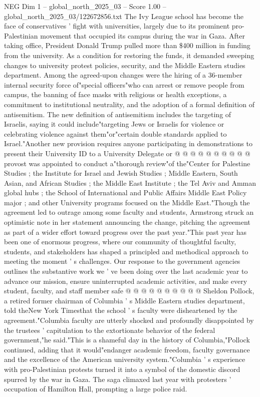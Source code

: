 \begin{textsample}{NEG Dim 1 – global\_north\_2025\_03 – Score 1.00 – global\_north\_2025\_03/122672856.txt}  \label{ex:f1_neg_051}
The Ivy League school has become the face of conservatives ' fight with universities, largely due to its prominent pro-Palestinian movement that occupied its campus during the war in Gaza.
After taking office, President Donald Trump pulled more than \$400 million in funding from the university.
As a condition for restoring the funds, it demanded sweeping changes to university protest policies, security, and the Middle Eastern studies department.
Among the agreed-upon changes were the hiring of a 36-member internal security force of"special officers"who can arrest or remove people from campus, the banning of face masks with religious or health exceptions, a commitment to institutional neutrality, and the adoption of a formal definition of antisemitism.
The new definition of antisemitism includes the targeting of Israelis, saying it could include"targeting Jews or Israelis for violence or celebrating violence against them"or"certain double standards applied to Israel."Another new provision requires anyone participating in demonstrations to present their University ID to a University Delegate or @ @ @ @ @ @ @ @ @ @ provost was appointed to conduct a"thorough review"of the"Center for Palestine Studies ; the Institute for Israel and Jewish Studies ; Middle Eastern, South Asian, and African Studies ; the Middle East Institute ; the Tel Aviv and Amman global hubs ; the School of International and Public Affairs Middle East Policy major ; and other University programs focused on the Middle East."Though the agreement led to outrage among some faculty and students, Armstrong struck an optimistic note in her statement announcing the change, pitching the agreement as part of a wider effort toward progress over the past year."This past year has been one of enormous progress, where our community of thoughtful faculty, students, and stakeholders has shaped a principled and methodical approach to meeting the moment ' s challenges.
Our response to the government agencies outlines the substantive work we ' ve been doing over the last academic year to advance our mission, ensure uninterrupted academic activities, and make every student, faculty, and staff member safe @ @ @ @ @ @ @ @ @ @ Sheldon Pollock, a retired former chairman of Columbia ' s Middle Eastern studies department, told theNew York Timesthat the school ' s faculty were disheartened by the agreement."Columbia faculty are utterly shocked and profoundly disappointed by the trustees ' capitulation to the extortionate behavior of the federal government,"he said."This is a shameful day in the history of Columbia,"Pollock continued, adding that it would"endanger academic freedom, faculty governance and the excellence of the American university system."Columbia ' s experience with pro-Palestinian protests turned it into a symbol of the domestic discord spurred by the war in Gaza.
The saga climaxed last year with protesters ' occupation of Hamilton Hall, prompting a large police raid.

\end{textsample}
